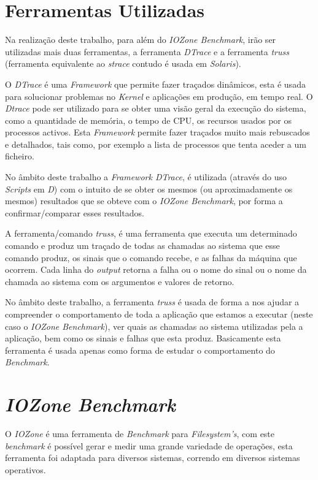 \documentclass[conference,compsoc]{IEEEtran}
\begin{document}
\section{Ferramentas Utilizadas}
Na realização deste trabalho, para além do \textit{IOZone Benchmark}, irão ser utilizadas mais duas ferramentas, a ferramenta \textit{DTrace} e a ferramenta \textit{truss} (ferramenta equivalente ao \textit{strace} contudo é usada em \textit{Solaris}).

O \textit{DTrace} é uma \textit{Framework} que permite fazer traçados dinâmicos, esta é usada para solucionar problemas no \textit{Kernel} e aplicações em produção, em tempo real. O \textit{Dtrace} pode ser utilizado para se obter uma visão geral da execução do sistema, como a quantidade de memória, o tempo de CPU, os recursos usados por os processos activos. Esta \textit{Framework} permite fazer traçados muito mais rebuscados e detalhados, tais como, por exemplo a lista de processos que tenta aceder a um ficheiro.

No âmbito deste trabalho a \textit{Framework DTrace}, é utilizada (através do uso \textit{Scripts} em \textit{D}) com o intuito de se obter os mesmos (ou aproximadamente os mesmos) resultados que se obteve com o \textit{IOZone Benchmark}, por forma a confirmar/comparar esses resultados.

A ferramenta/comando \textit{truss}, é uma ferramenta que executa um determinado comando e produz um traçado de todas as chamadas ao sistema que esse comando produz, os sinais que o comando recebe, e as falhas da máquina que ocorrem. Cada linha do \textit{output} retorna a falha ou o nome do sinal ou o nome da chamada ao sistema com os argumentos e valores de retorno.

No âmbito deste trabalho, a ferramenta \textit{truss} é usada de forma a nos ajudar a compreender o comportamento de toda a aplicação que estamos a executar (neste caso o \textit{IOZone Benchmark}), ver quais as chamadas ao sistema utilizadas pela a aplicação, bem como os sinais e falhas que esta produz. Basicamente esta ferramenta é usada apenas como forma de estudar o comportamento do \textit{Benchmark}.

\section{\textit{IOZone Benchmark}}

O \textit{IOZone} é uma ferramenta de \textit{Benchmark} para \textit{Filesystem's}, com este \textit{benchmark} é possível gerar e medir uma grande variedade de operações, esta ferramenta foi adaptada para diversos sistemas, correndo em diversos sistemas operativos.
\end{document}
